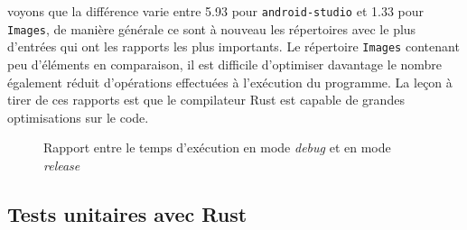 voyons que la différence varie entre 5.93 pour \texttt{android-studio} et 1.33 pour 
\texttt{Images}, de manière générale ce sont à nouveau les répertoires 
avec le plus d'entrées qui ont les rapports les plus importants. Le répertoire \texttt{Images} 
contenant peu d'éléments en comparaison, il est difficile d'optimiser davantage le nombre 
également réduit d'opérations effectuées à l'exécution du programme. La leçon à tirer de ces rapports est 
que le compilateur Rust est capable de grandes optimisations sur le code.
\begin{figure}
    \begin{center}
    \end{center}
    \caption{Rapport entre le temps d'exécution en mode \textit{debug} et en mode \textit{release}}
    \label{histo2}
\end{figure}
\subsection{Tests unitaires avec Rust}

